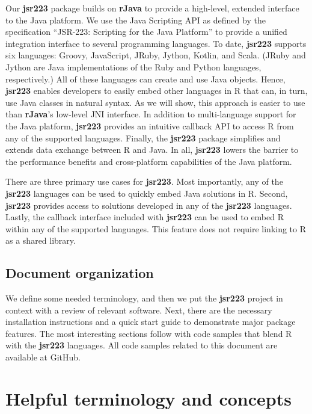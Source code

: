 Our \textbf{jsr223} package builds on \textbf{rJava} to provide a high-level, extended interface to the Java platform. We use the Java Scripting API \citep{jsa} as defined by the specification “JSR-223: Scripting for the Java Platform” \citep{jsr223spec} to provide a unified integration interface to several programming languages. To date, \textbf{jsr223} supports six languages: Groovy, JavaScript, JRuby, Jython, Kotlin, and Scala. (JRuby and Jython are Java implementations of the Ruby and Python languages, respectively.) All of these languages can create and use Java objects. Hence, \textbf{jsr223} enables developers to easily embed other languages in R that can, in turn, use Java classes in natural syntax. As we will show, this approach is easier to use than \textbf{rJava}'s low-level JNI interface. In addition to multi-language support for the Java platform, \textbf{jsr223} provides an intuitive callback API to access R from any of the supported languages. Finally, the \textbf{jsr223} package simplifies and extends data exchange between R and Java. In all, \textbf{jsr223} lowers the barrier to the performance benefits and cross-platform capabilities of the Java platform.

There are three primary use cases for \textbf{jsr223}. Most importantly, any of the \textbf{jsr223} languages can be used to quickly embed Java solutions in R. Second, \textbf{jsr223} provides access to solutions developed in any of the \textbf{jsr223} languages. Lastly, the callback interface included with \textbf{jsr223} can be used to embed R within any of the supported languages. This feature does not require linking to R as a shared library.

\subsection{Document organization}

We define some needed terminology, and then we put the \textbf{jsr223} project in context with a review of relevant software. Next, there are the necessary installation instructions and a quick start guide to demonstrate major package features. The most interesting sections follow with code samples that blend R with the \textbf{jsr223} languages. All code samples related to this document are available at GitHub.

\section{Helpful terminology and concepts}

